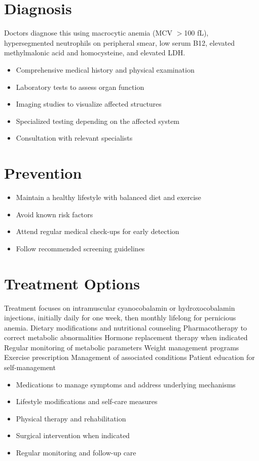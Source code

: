 \section{Diagnosis}
Doctors diagnose this using macrocytic anemia (MCV $>$100 fL), hypersegmented neutrophils on peripheral smear, low serum B12, elevated methylmalonic acid and homocysteine, and elevated LDH.

\begin{itemize}[noitemsep]
  \item Comprehensive medical history and physical examination
  \item Laboratory tests to assess organ function
  \item Imaging studies to visualize affected structures
  \item Specialized testing depending on the affected system
  \item Consultation with relevant specialists
\end{itemize}
\section{Prevention}
\begin{itemize}[noitemsep]
  \item Maintain a healthy lifestyle with balanced diet and exercise
  \item Avoid known risk factors
  \item Attend regular medical check-ups for early detection
  \item Follow recommended screening guidelines
\end{itemize}
\section{Treatment Options}
Treatment focuses on intramuscular cyanocobalamin or hydroxocobalamin injections, initially daily for one week, then monthly lifelong for pernicious anemia. Dietary modifications and nutritional counseling Pharmacotherapy to correct metabolic abnormalities Hormone replacement therapy when indicated Regular monitoring of metabolic parameters Weight management programs Exercise prescription Management of associated conditions Patient education for self-management

\begin{itemize}[noitemsep]
  \item Medications to manage symptoms and address underlying mechanisms
  \item Lifestyle modifications and self-care measures
  \item Physical therapy and rehabilitation
  \item Surgical intervention when indicated
  \item Regular monitoring and follow-up care
\end{itemize}
